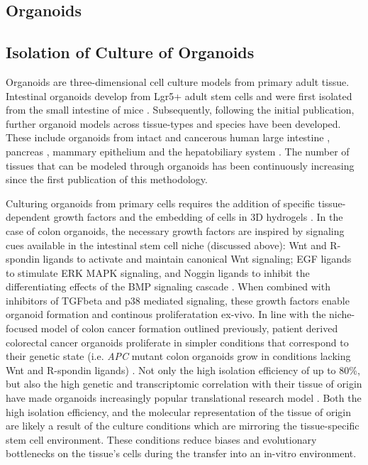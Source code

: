\begin{flushleft}
\section{Organoids}

\subsection{Isolation of Culture of Organoids}

Organoids are three-dimensional cell culture models from primary adult tissue. Intestinal organoids develop from Lgr5+ adult stem cells and were first isolated from the small intestine of mice \citep{satoLongtermExpansionEpithelial2011}. Subsequently, following the initial publication, further organoid models across tissue-types and species have been developed. These include organoids from intact and cancerous human large intestine \citep{satoLongtermExpansionEpithelial2011}, pancreas \citep{driehuisPancreaticCancerOrganoids2019}, mammary epithelium \citep{zhangEstablishingEstrogenresponsiveMouse2017, sachsLivingBiobankBreast2018} and the hepatobiliary system \citep{huchVitroExpansionSingle2013}. The number of tissues that can be modeled through organoids has been continuously increasing since the first publication of this methodology. \par

Culturing organoids from primary cells requires the addition of specific tissue-dependent growth factors and the embedding of cells in 3D hydrogels \citep{merkerGastrointestinalOrganoidsHow2016}. In the case of colon organoids, the necessary growth factors are inspired by signaling cues available in the intestinal stem cell niche (discussed above): Wnt and R-spondin ligands to activate and maintain canonical Wnt signaling; EGF ligands to stimulate ERK MAPK signaling, and Noggin ligands to inhibit the differentiating effects of the BMP signaling cascade \citep{satoGrowingSelforganizingMiniguts2013}. When combined with inhibitors of TGFbeta and p38 mediated signaling, these growth factors enable organoid formation and continous proliferatation ex-vivo. In line with the niche-focused model of colon cancer formation outlined previously, patient derived colorectal cancer organoids proliferate in simpler conditions that correspond to their genetic state (i.e. \textit{APC} mutant colon organoids grow in conditions lacking Wnt and R-spondin ligands) \citep{Fujii2016-ax}. Not only the high isolation efficiency of up to 80\%, but also the high genetic and transcriptomic correlation with their tissue of origin have made organoids increasingly popular translational research model \citep{pauliPersonalizedVitroVivo2017a}. Both the high isolation efficiency, and the molecular representation of the tissue of origin are likely a result of the culture conditions which are mirroring the tissue-specific stem cell environment. These conditions reduce biases and evolutionary bottlenecks on the tissue's cells during the transfer into an in-vitro environment. \par


\end{flushleft}

